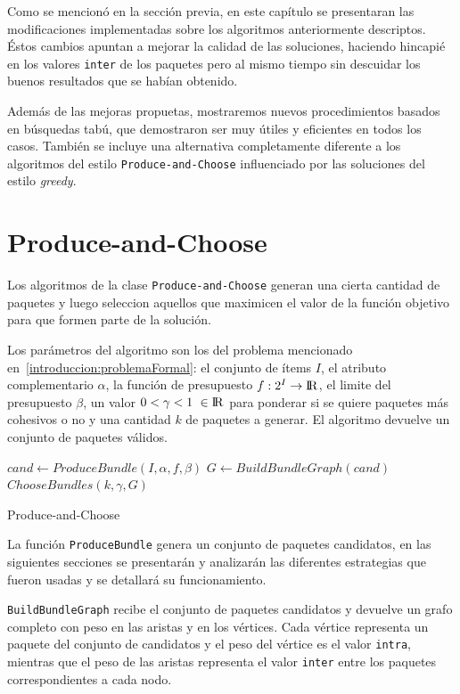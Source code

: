 Como se mencionó en la sección previa, en este capítulo se presentaran las modificaciones implementadas sobre los algoritmos anteriormente descriptos. Éstos cambios apuntan a mejorar la calidad de las soluciones, haciendo hincapié en los valores \texttt{inter} de los paquetes pero al mismo tiempo sin descuidar los buenos resultados que se habían obtenido.

Además de las mejoras propuetas, mostraremos nuevos procedimientos basados en búsquedas tabú, que demostraron ser muy útiles y eficientes en todos los casos. También se incluye una alternativa completamente diferente a los algoritmos del estilo \texttt{Produce\allowbreak-and\allowbreak-Choose} influenciado por las soluciones del estilo \emph{greedy}.

\section{Produce-and-Choose}
Los algoritmos de la clase \texttt{Produce\allowbreak-and\allowbreak-Choose} generan una cierta cantidad de paquetes y luego seleccion aquellos que maximicen el valor de la función objetivo para que formen parte de la solución.

Los parámetros del algoritmo son los del problema mencionado en~\autoref{introduccion:problemaFormal}: el conjunto de ítems $I$, el atributo complementario $\alpha$, la función de presupuesto $f: 2^{I} \rightarrow \rm I \!R$, el limite del presupuesto $\beta$, un valor $0 < \gamma < 1\ \in \rm I \!R$ para ponderar si se quiere paquetes más cohesivos o no y una cantidad $k$ de paquetes a generar. El algoritmo devuelve un conjunto de paquetes válidos.

\begin{center}
	\begin{algorithm}[H]
	\DontPrintSemicolon
	\SetAlgoLined
		$cand \leftarrow ProduceBundle(I,\alpha,f,\beta)$\;
		$G \leftarrow BuildBundleGraph(cand)$\;
		\Return $ChooseBundles(k,\gamma,G)$\;
	\caption{Produce-and-Choose}\label{alg:PAC}
	\end{algorithm}
\end{center}

La función \texttt{ProduceBundle} genera un conjunto de paquetes candidatos, en las siguientes secciones se presentarán y analizarán las diferentes estrategias que fueron usadas y se detallará su funcionamiento.

\texttt{BuildBundleGraph} recibe el conjunto de paquetes candidatos y devuelve un grafo completo con peso en las aristas y en los vértices. Cada vértice representa un paquete del conjunto de candidatos y el peso del vértice es el valor \texttt{intra}, mientras que el peso de las aristas representa el valor \texttt{inter} entre los paquetes correspondientes a cada nodo. 

